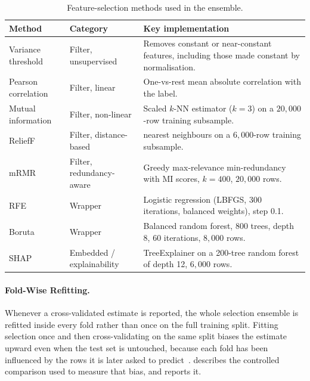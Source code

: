 \begin{table}[!htbp]
	\centering
	\caption{Feature-selection methods used in the ensemble.}
	\label{tab:fsmethods}
	\scriptsize
	\setlength{\tabcolsep}{3pt}
	\renewcommand{\arraystretch}{0.9}
	\begin{tabularx}{\textwidth}{@{}>{\raggedright\arraybackslash}p{2.45cm} >{\raggedright\arraybackslash}p{2.55cm} >{\raggedright\arraybackslash}X@{}}
		\toprule
		\textbf{Method} & \textbf{Category} & \textbf{Key implementation}\\
		\midrule
		Variance threshold  & Filter, unsupervised & Removes constant or near-constant features, including those made constant by normalisation.\\
		Pearson correlation & Filter, linear & One-vs-rest mean absolute correlation with the label.\\
		Mutual information  & Filter, non-linear & Scaled $k$-NN estimator ($k = 3$) on a $20{,}000$-row training subsample.\\
		ReliefF             & Filter, distance-based & 10 nearest neighbours on a $6{,}000$-row training subsample.\\
		mRMR                & Filter, redundancy-aware & Greedy max-relevance min-redundancy with MI scores, $k = 400$, $20{,}000$ rows.\\
		RFE                 & Wrapper & Logistic regression (LBFGS, 300 iterations, balanced weights), step 0.1.\\
		Boruta              & Wrapper & Balanced random forest, 800 trees, depth 8, 60 iterations, $8{,}000$ rows.\\
		SHAP                & Embedded / explainability & TreeExplainer on a 200-tree random forest of depth 12, $6{,}000$ rows.\\
		\bottomrule
	\end{tabularx}
\end{table}

\paragraph[Fold-Wise Refitting]{Fold-Wise Refitting.}
Whenever a cross-validated estimate is reported, the whole selection ensemble is refitted inside every fold rather than once on the full training split. Fitting selection once and then cross-validating on the same split biases the estimate upward even when the test set is untouched, because each fold has been influenced by the rows it is later asked to predict~\cite{ambroise2002selection,varma2006bias}.  describes the controlled comparison used to measure that bias, and  reports it.


